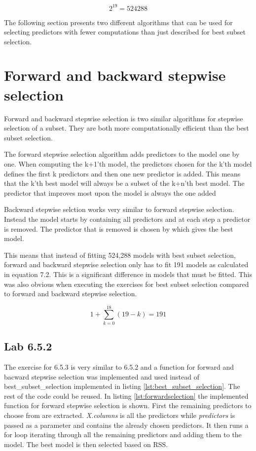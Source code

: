 \begin{equation}
2^{19} = 524288
\end{equation}

The following section presents two different algorithms that can be used for selecting predictors with fewer computations than just described for best subset selection.

\section{Forward and backward stepwise selection}
Forward and backward stepwise selection is two similar algorithms for stepwise selection of a subset. They are both more computationally efficient than the best subset selection.

The forward stepwise selection algorithm adds predictors to the model one by one. When computing the k+1'th model, the predictors chosen for the k'th model defines the first k predictors and then one new predictor is added. This means that the k'th best model will always be a subset of the k+n'th best model. The predictor that improves most upon the model is always the one added

Backward stepwise selction works very similar to forward stepwise selection. Instead the model starts by containing all predictors and at each step a predictor is removed. The predictor that is removed is chosen by which gives the best model.

This means that instead of fitting 524,288 models with best subset selection, forward and backward stepwise selection only has to fit 191 models as calculated in equation 7.2. This is a significant difference in models that must be fitted.  This was also obvious when executing the exercises for best subset selection compared to forward and backward stepwise selection.

\begin{equation}
1+ \sum_{k=0}^{18}(19-k) = 191
\end{equation}

\subsection{Lab 6.5.2}
The exercise for 6.5.3 is very similar to 6.5.2 and a function for forward and bacward stepwise selection was implemented and used instead of best\_subset\_selection implemented in listing \ref{lst:best_subset_selection}. The rest of the code could be reused. In listing \ref{lst:forwardselection} the implemented function for forward stepwise selection is shown. First the remaining predictors to choose from are extracted. \emph{X.columns} is all the predictors while \emph{predictors} is passed as a parameter and contains the already chosen predictors. It then runs a for loop iterating through all the remaining predictors and adding them to the model. The best model is then selected based on RSS.

